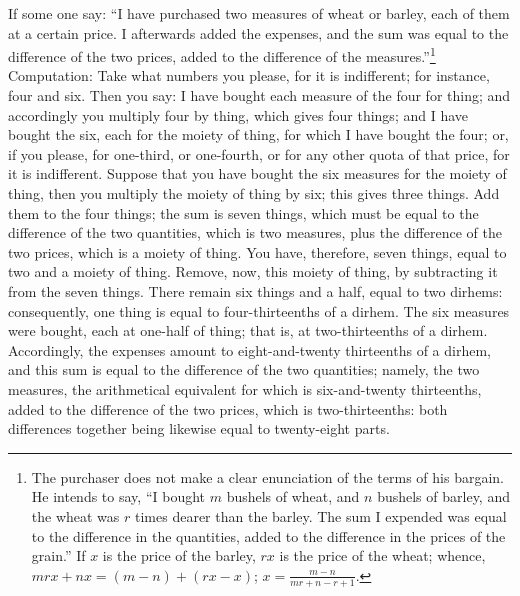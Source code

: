 If some one say: ``I have purchased two measures of wheat or barley, each of them at a certain price. I afterwards added the expenses, and the sum was equal to the difference of the two prices, added to the difference of the measures.''\footnote{The purchaser does not make a clear enunciation of the terms of his bargain. He intends to say, ``I bought $m$ bushels of wheat, and $n$ bushels of barley, and the wheat was $r$ times dearer than the barley. The sum I expended was equal to the difference in the quantities, added to the difference in the prices of the grain.'' If $x$ is the price of the barley, $rx$ is the price of the wheat; whence, $mrx + nx = (m-n) + (rx - x)$; $x = \frac{m-n}{mr+n-r+1}$.} Computation: Take what numbers you please, for it is indifferent; for instance, four and six. Then you say: I have bought each measure of the four for thing; and accordingly you multiply four by thing, which gives four things; and I have bought the six, each for the moiety of thing, for which I have bought the four; or, if you please, for one-third, or one-fourth, or for any other quota of that price, for it is indifferent. Suppose that you have bought the six measures for the moiety of thing, then you multiply the moiety of thing by six; this gives three things. Add them to the four things; the sum is seven things, which must be equal to the difference of the two quantities, which is two measures, plus the difference of the two prices, which is a moiety of thing. You have, therefore, seven things, equal to two and a moiety of thing. Remove, now, this moiety of thing, by subtracting it from the seven things. There remain six things and a half, equal to two dirhems: consequently, one thing is equal to four-thirteenths of a dirhem. The six measures were bought, each at one-half of thing; that is, at two-thirteenths of a dirhem. Accordingly, the expenses amount to eight-and-twenty thirteenths of a dirhem, and this sum is equal to the difference of the two quantities; namely, the two measures, the arithmetical equivalent for which is six-and-twenty thirteenths, added to the difference of the two prices, which is two-thirteenths: both differences together being likewise equal to twenty-eight parts.

